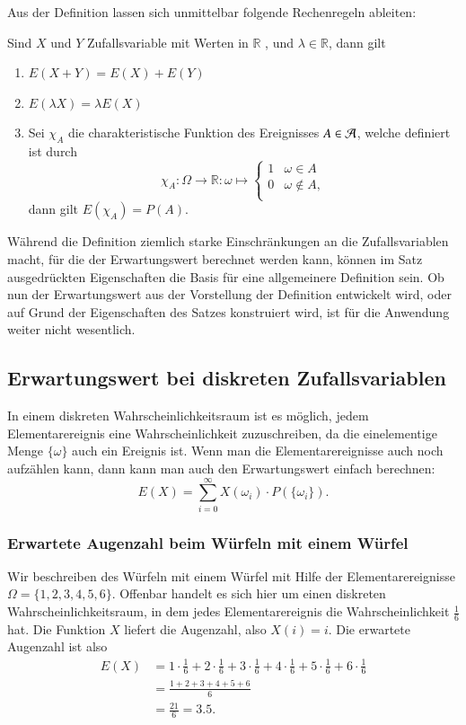 Aus der Definition lassen sich unmittelbar folgende Rechenregeln ableiten:
\begin{satz}
\label{rechenregeln-erwartungswert}
Sind $X$ und $Y$ Zufallsvariable mit Werten in $\mathbb{R}$ ,
und $\lambda\in\mathbb{R}$, dann gilt
\begin{enumerate}
\item $E(X+Y)=E(X)+E(Y)$
\item $E(\lambda X)=\lambda E(X)$
\item Sei $\chi_A$ die charakteristische Funktion des Ereignisses $A\in{\cal A}$,
welche definiert ist durch
\[
\chi_A\colon\Omega\to\mathbb{R}:\omega\mapsto\begin{cases}
1&\omega\in A\\
0&\omega\not\in A,\\
\end{cases}
\]
dann gilt $E(\chi_A)=P(A)$.
\end{enumerate}
\end{satz}
Während die Definition ziemlich starke Einschränkungen an die Zufallsvariablen
macht, für die der Erwartungswert berechnet werden kann, können
im Satz ausgedrückten Eigenschaften die Basis für eine allgemeinere
Definition sein.
Ob nun der Erwartungswert aus der Vorstellung der Definition
entwickelt wird, oder auf Grund der Eigenschaften des Satzes konstruiert
wird, ist für die Anwendung weiter nicht wesentlich.

\subsection{Erwartungswert bei diskreten Zufallsvariablen}
In einem diskreten Wahrscheinlichkeitsraum ist es möglich, jedem
Elementarereignis eine Wahrscheinlichkeit zuzuschreiben, da die
einelementige Menge $\{\omega\}$ auch ein Ereignis ist.
Wenn man
die Elementarereignisse auch noch aufzählen kann, dann kann man
auch den Erwartungswert einfach berechnen:
\[
E(X)=\sum_{i=0}^\infty X(\omega_i)\cdot P(\{\omega_i\}).
\]
\subsubsection{Erwartete Augenzahl beim Würfeln mit einem Würfel}
Wir beschreiben des Würfeln mit einem Würfel mit Hilfe der
Elementarereignisse $\Omega=\{1,2,3,4,5,6\}$.
Offenbar handelt es sich
hier um einen diskreten Wahrscheinlichkeitsraum, in dem jedes
Elementarereignis die Wahrscheinlichkeit $\frac16$ hat.
Die Funktion
$X$ liefert die Augenzahl, also $X(i)=i$.
Die erwartete Augenzahl
ist also
\begin{align*}
E(X)&=
1\cdot\frac16+
2\cdot\frac16+
3\cdot\frac16+
4\cdot\frac16+
5\cdot\frac16+
6\cdot\frac16\\
&=\frac{1+2+3+4+5+6}6\\
&=\frac{21}{6}=3.5.
\end{align*}
